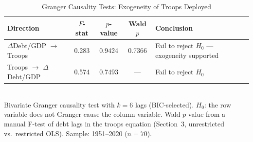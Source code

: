 \begin{table}[htbp]
  \centering
  \caption{Granger Causality Tests: Exogeneity of Troops Deployed}
  \label{tab:exogeneity}
  \begin{tabular}{lcccp{5cm}}
    \toprule
    Direction & $F$-stat & $p$-value & Wald $p$ & Conclusion \\
    \midrule
    $\Delta$Debt/GDP $\to$ Troops & 0.283 & 0.9424 & 0.7366 & Fail to reject $H_0$ --- exogeneity supported \\
    Troops $\to$ $\Delta$Debt/GDP & 0.574 & 0.7493 & ---  & Fail to reject $H_0$ \\
    \bottomrule
  \end{tabular}
  \\[2pt] \footnotesize{Bivariate Granger causality test with $k = 6$ lags (BIC-selected). $H_0$: the row variable does not Granger-cause the column variable. Wald $p$-value from a manual F-test of debt lags in the troops equation (Section~3, unrestricted vs.~restricted OLS). Sample: 1951--2020 ($n = 70$).}
\end{table}
